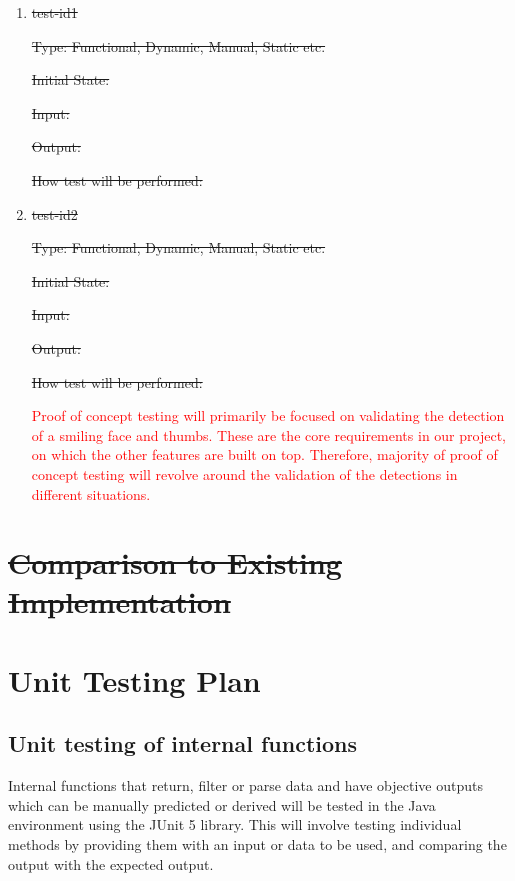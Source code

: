 \documentclass[12pt, titlepage]{article}
\begin{document}
\begin{enumerate}

\item{\sout{test-id1}\\}

\sout{Type: Functional, Dynamic, Manual, Static etc.}
					
\sout{Initial State: }
					
\sout{Input: }
					
\sout{Output: }
					
\sout{How test will be performed: }
					
\item{\sout{test-id2}\\}

\sout{Type: Functional, Dynamic, Manual, Static etc.}
					
\sout{Initial State: }
					
\sout{Input: }
					
\sout{Output: }
					
\sout{How test will be performed: }

\textcolor{red}{Proof of concept testing will primarily be focused on validating the detection of a smiling face and thumbs. These are the core requirements in our project, on which the other features are built on top. Therefore, majority of proof of concept testing will revolve around the validation of the detections in different situations. }

\end{enumerate}

	
\section{\sout{Comparison to Existing Implementation}}
				
\section{Unit Testing Plan}
		
\subsection{Unit testing of internal functions} 

\hspace{\parindent} Internal functions that return, filter or parse data and have objective outputs which can be manually predicted or derived will be tested in the Java environment using the JUnit 5 library. This will involve testing individual methods by providing them with an input or data to be used, and comparing the output with the expected output.
\end{document}
